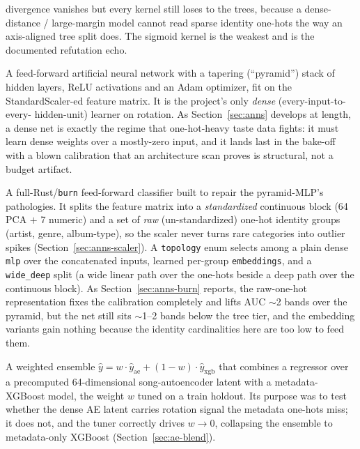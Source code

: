 \documentclass[11pt]{article}
\begin{document}
\begin{description}
  divergence vanishes but every kernel still loses to the trees, because a
  dense-distance / large-margin model cannot read sparse identity one-hots the
  way an axis-aligned tree split does. The sigmoid kernel is the weakest and is
  the documented refutation echo.
  \item[Pyramid-MLP (\texttt{pyramid-mlp-classifier}).] A feed-forward
  artificial neural network with a tapering (``pyramid'') stack of hidden
  layers, ReLU activations and an Adam optimizer, fit on the StandardScaler-ed
  feature matrix. It is the project's only \emph{dense} (every-input-to-every-
  hidden-unit) learner on rotation. As Section~\ref{sec:anns} develops at
  length, a dense net is exactly the regime that one-hot-heavy taste data
  fights: it must learn dense weights over a mostly-zero input, and it lands
  last in the bake-off with a blown calibration that an architecture scan
  proves is structural, not a budget artifact.
  \item[Representation-aware net (\texttt{burn-deep-classifier}).] A
  full-Rust/\texttt{burn} feed-forward classifier built to repair the
  pyramid-MLP's pathologies. It splits the feature matrix into a
  \emph{standardized} continuous block (64 PCA $+$ 7 numeric) and a set of
  \emph{raw} (un-standardized) one-hot identity groups (artist, genre,
  album-type), so the scaler never turns rare categories into outlier spikes
  (Section~\ref{sec:anns-scaler}). A \texttt{topology} enum selects among a
  plain dense \texttt{mlp} over the concatenated inputs, learned per-group
  \texttt{embeddings}, and a \texttt{wide\_deep} split (a wide linear path over
  the one-hots beside a deep path over the continuous block). As
  Section~\ref{sec:anns-burn} reports, the raw-one-hot representation fixes the
  calibration completely and lifts AUC $\sim$2 bands over the pyramid, but the
  net still sits $\sim$1--2 bands below the tree tier, and the embedding
  variants gain nothing because the identity cardinalities here are too low to
  feed them.
  \item[Autoencoder-XGBoost blend (\texttt{autoencoder-xgboost}).] A weighted
  ensemble $\hat{y}=w\cdot\hat{y}_{\text{ae}}+(1-w)\cdot\hat{y}_{\text{xgb}}$
  that combines a regressor over a precomputed 64-dimensional
  song-autoencoder latent with a metadata-XGBoost model, the weight $w$ tuned on
  a train holdout. Its purpose was to test whether the dense AE latent carries
  rotation signal the metadata one-hots miss; it does not, and the tuner
  correctly drives $w\to 0$, collapsing the ensemble to metadata-only XGBoost
  (Section~\ref{sec:ae-blend}).
\end{description}
\end{document}
